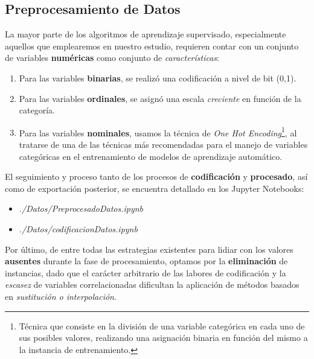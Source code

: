 

 \subsection{Preprocesamiento de Datos}

 La mayor parte de los algoritmos de aprendizaje supervisado, especialmente aquellos que emplearemos en nuestro estudio, requieren contar con un conjunto de variables \textbf{numéricas} como conjunto de \textit{características}:
 
 \begin{enumerate}
     \item Para las variables \textbf{binarias}, se realizó una codificación a nivel de bit (0,1).
     \item Para las variables \textbf{ordinales}, se asignó una escala \textit{creciente} en función de la categoría.
     \item Para las variables \textbf{nominales}, usamos la técnica de \textit{One Hot Encoding}\footnote{Técnica que consiste en la división de una variable categórica en cada uno de sus posibles valores, realizando una asignación binaria en función del mismo a la instancia de entrenamiento.}, al tratarse de una de las técnicas más recomendadas para el manejo de variables categóricas en el entrenamiento de modelos de aprendizaje automático\cite{Potdar2017AClassifiers}.
 \end{enumerate}

 El seguimiento y proceso tanto de los procesos de \textbf{codificación} y \textbf{procesado}, así como de exportación posterior, se encuentra detallado en los Jupyter Notebooks: 
 
 \begin{itemize}
     \item  \textit{./Datos/PreprocesadoDatos.ipynb}
     \item \textit{./Datos/codificacionDatos.ipynb}
 \end{itemize}

Por último, de entre todas las estrategias \cite{Emmanuel2021ALearning} existentes para lidiar con los valores \textbf{ausentes} durante la fase de procesamiento, optamos por la \textbf{eliminación} de instancias, dado que el carácter arbitrario de las labores de codificación y la \textit{escasez} de variables correlacionadas dificultan la aplicación de métodos basados en \textit{sustitución o interpolación}. 


